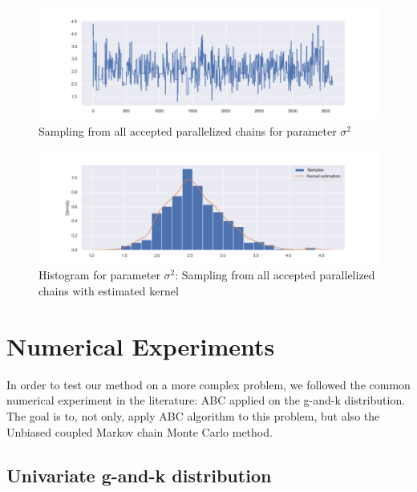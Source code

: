 \documentclass {article}
\begin{document}
\begin{figure}[h!]
	\centering
	\includegraphics[width=\textwidth]{doublecoupling_pack/doublecoupling_sampling_sigma}
	\caption{Sampling from all accepted parallelized chains for parameter $\sigma^2$ }   %
	\label{sigmaallsamdouble}
\end{figure}


\begin{figure}[h!]
	\centering
	\includegraphics[width=\textwidth]{doublecoupling_pack/doublecoupling_sigma_histogram_kernel}
	\caption{Histogram for parameter $\sigma^2$: Sampling from all accepted parallelized chains with estimated kernel }   %
	\label{sigmahistdouble}
\end{figure}














	\section{Numerical Experiments}
In order to test our method on a more complex problem, we followed the common numerical experiment in the literature: ABC applied on the g-and-k distribution.
The goal is to, not only, apply ABC algorithm to this problem, but also the Unbiased coupled Markov chain Monte Carlo method.


\subsection{Univariate g-and-k distribution}
\end{document}
